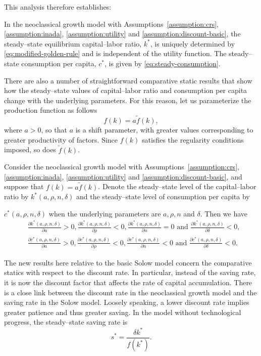 \documentclass[\topdir/lecture\_notes.tex]{subfiles}
\begin{document}
This analysis therefore establishes:
\begin{proposition}\label{prop:steady--state}
  In the neoclassical growth model with Assumptions~\ref{assumption:crs}, \ref{assumption:inada}, \ref{assumption:utility} and \ref{assumption:discount-basic}, the steady--state equilibrium capital--labor ratio, $k^*$, is uniquely determined by \eqref{eq:modified-golden-rule} and is independent of the utility function. The steady--state consumption per capita, $c^*$, is given by \eqref{eq:steady-consumption}.
\end{proposition}

There are also a number of straightforward comparative static results that show how the steady--state values of capital--labor ratio and consumption per capita change with the underlying parameters. For this reason, let us parameterize the production function as follows
\[
  f(k)=a \tilde{f}(k),
\]
where $a>0$, so that $a$ is a shift parameter, with greater values corresponding to greater productivity of factors. Since $f(k)$ satisfies the regularity conditions imposed, so does $\tilde{f}(k)$.

\begin{proposition}\label{prop:comparative-statics}
  Consider the neoclassical growth model with Assumptions~\ref{assumption:crs}, \ref{assumption:inada}, \ref{assumption:utility} and \ref{assumption:discount-basic}, and suppose that $f(k)=a \tilde{f}(k)$. Denote the steady--state level of the capital--labor ratio by $k^*(a, \rho, n, \delta)$ and the steady--state level of consumption per capita by

  $c^*(a, \rho, n, \delta)$ when the underlying parameters are $a, \rho, n$ and $\delta$. Then we have
  \[
    \begin{aligned}
       & \frac{\partial k^{*}(a, \rho, n, \delta)}{\partial a}>0, \frac{\partial k^{*}(a, \rho, n, \delta)}{\partial \rho}<0, \frac{\partial k^{*}(a, \rho, n, \delta)}{\partial n}=0 \text { and } \frac{\partial k^{*}(a, \rho, n, \delta)}{\partial \delta}<0, \\
       & \frac{\partial c^{*}(a, \rho, n, \delta)}{\partial a}>0, \frac{\partial c^{*}(a, \rho, n, \delta)}{\partial \rho}<0, \frac{\partial c^{*}(a, \rho, n, \delta)}{\partial n}<0 \text { and } \frac{\partial c^{*}(a, \rho, n, \delta)}{\partial \delta}<0.
    \end{aligned}
  \]
\end{proposition}

The new results here relative to the basic Solow model concern the comparative statics with respect to the discount rate. In particular, instead of the saving rate, it is now the discount factor that affects the rate of capital accumulation. There is a close link between the discount rate in the neoclassical growth model and the saving rate in the Solow model. Loosely speaking, a lower discount rate implies greater patience and thus greater saving. In the model without technological progress, the steady--state saving rate is
\[
  s^{*}=\frac{\delta k^{*}}{f\left(k^{*}\right)}.
\]
\end{document}
